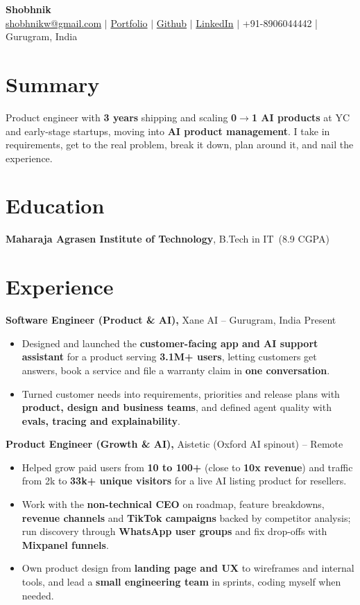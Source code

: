\documentclass[10pt,a4paper]{article}
\newcommand{\resumeheader}[6]{%
    {\centering
        {\Large \textbf{#1}}\\[4pt]
        \href{mailto:#2}{#2} $|$
        \href{#3}{Portfolio} $|$
        \href{#4}{Github} $|$
        \href{#5}{LinkedIn} $|$
        #6\par}
}
\newcommand{\education}[4]{%
    \textbf{#1}, #2\ (#3) \hfill #4
}
\newcommand{\experience}[4]{%
    \textbf{#1,} #2 -- #3 \hfill #4
}
\begin{document}
\resumeheader{Shobhnik}
{shobhnikw@gmail.com}
{https://shobhnik.xyz}
{https://github.com/shobhnik13}
{https://www.linkedin.com/in/shobhnik13/}
{+91-8906044442 | Gurugram, India}

\section{Summary}
Product engineer with \textbf{3 years} shipping and scaling \textbf{0$\rightarrow$1 AI products} at YC and early-stage startups, moving into \textbf{AI product management}. I take in requirements, get to the real problem, break it down, plan around it, and nail the experience.

\section{Education}
\education{Maharaja Agrasen Institute of Technology}{B.Tech in IT}{8.9 CGPA}{}

\section{Experience}

\experience{Software Engineer (Product \& AI)}{Xane AI}{Gurugram, India}{Present}
\begin{itemize}[leftmargin=20pt]
\item Designed and launched the \textbf{customer-facing app and AI support assistant} for a product serving \textbf{3.1M+ users}, letting customers get answers, book a service and file a warranty claim in \textbf{one conversation}.
\item Turned customer needs into requirements, priorities and release plans with \textbf{product, design and business teams}, and defined agent quality with \textbf{evals, tracing and explainability}.
\end{itemize}

\experience{Product Engineer (Growth \& AI)}{Aistetic (Oxford AI spinout)}{Remote}{}
\begin{itemize}[leftmargin=20pt]
\item Helped grow paid users from \textbf{10 to 100+} (close to \textbf{10x revenue}) and traffic from 2k to \textbf{33k+ unique visitors} for a live AI listing product for resellers.
\item Work with the \textbf{non-technical CEO} on roadmap, feature breakdowns, \textbf{revenue channels} and \textbf{TikTok campaigns} backed by competitor analysis; run discovery through \textbf{WhatsApp user groups} and fix drop-offs with \textbf{Mixpanel funnels}.
\item Own product design from \textbf{landing page and UX} to wireframes and internal tools, and lead a \textbf{small engineering team} in sprints, coding myself when needed.
\end{itemize}
\end{document}
